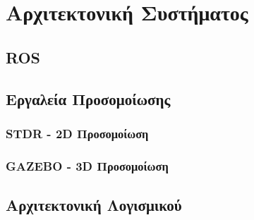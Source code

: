 
\chapter{Αρχιτεκτονική Συστήματος} %

\label{Chapter4} %


\section{ROS}


\section{Εργαλεία Προσομοίωσης}
\subsection{STDR - 2D Προσομοίωση}
\subsection{GAZEBO - 3D Προσομοίωση}

\section{Αρχιτεκτονική Λογισμικού}
